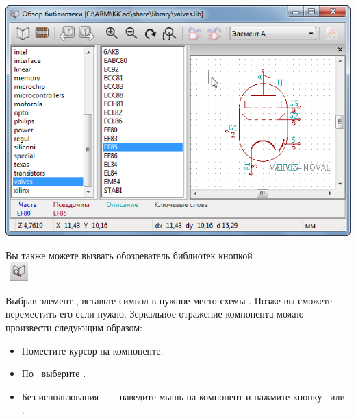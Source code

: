 \begin{itemize}
\begin{enumerate}
\includegraphics[height=0.5\textheight]{kicad/ee19.png}

  \end{enumerate} 
\end{itemize}

Вы также можете
вызвать обозреватель библиотек кнопкой\\
\ \includegraphics[height=2em]{kicad/ee20.png}

Выбрав элемент \dblms, вставьте символ в нужное место схемы \lms.
Позже вы сможете переместить его если нужно.
Зеркальное отражение компонента можно произвести следующим образом:

\begin{itemize}
  \item Поместите курсор на компоненте.
  \item По \rms\ выберите . 
  \item Без использования \ --- наведите мышь на
  компонент и нажмите кнопку \ или .
\end{itemize}

